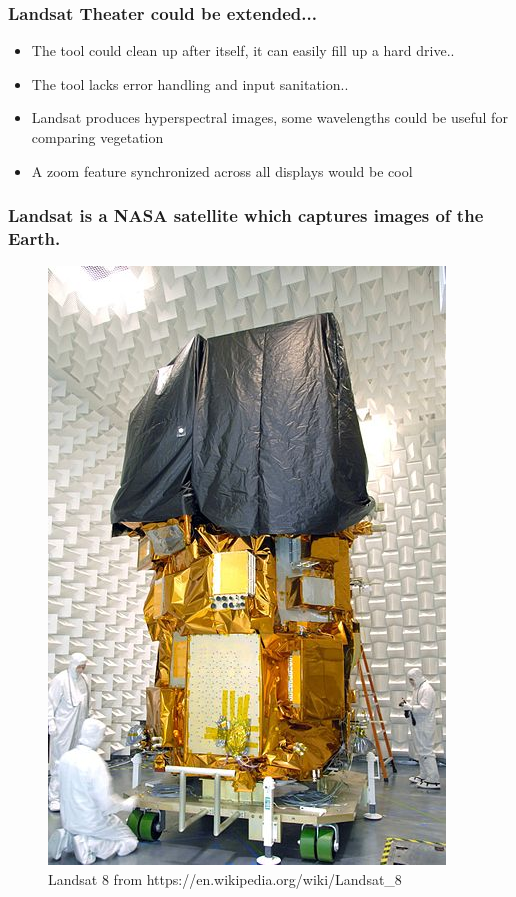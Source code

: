 \documentclass{beamer}
\begin{document}
    \begin{frame}
        \frametitle{Landsat Theater could be extended...}
        \begin{itemize}
            \item The tool could clean up after itself, it can easily fill up a hard drive..
            \item The tool lacks error handling and input sanitation.. 
            \item Landsat produces hyperspectral images, some wavelengths could be useful for comparing vegetation
            \item A zoom feature synchronized across all displays would be cool
        \end{itemize}
    \end{frame}

    \begin{frame}
        \frametitle{Landsat is a NASA satellite which captures images of the Earth.}
            \begin{figure}
            \includegraphics[width=.75\paperheight]{figures/groundlandsat.jpg}
            \caption{Landsat 8 from https://en.wikipedia.org/wiki/Landsat\_8}
            \end{figure}
    \end{frame}
\end{document}
